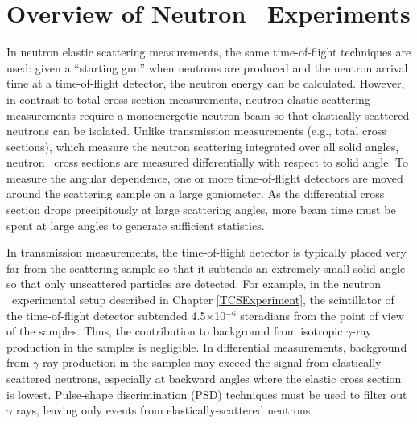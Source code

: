 \section{Overview of Neutron \el\ Experiments}
In neutron elastic scattering measurements, the same time-of-flight techniques are used:
given a ``starting gun'' when neutrons are produced and the neutron arrival time
at a time-of-flight detector, the neutron energy can be calculated.
However, in contrast to total cross section measurements, neutron elastic scattering
measurements require a monoenergetic neutron beam so that elastically-scattered
neutrons can be isolated. Unlike transmission measurements (e.g., total cross
sections), which measure the neutron scattering integrated
over all solid angles, neutron \el\ cross sections are measured differentially with respect to 
solid angle. To measure the angular dependence, one or more time-of-flight detectors
are moved around the scattering sample on a large goniometer. As the differential cross section 
drops precipitously at large scattering angles, more beam time must be spent at
large angles to generate sufficient statistics.

In transmission measurements, the time-of-flight detector is typically placed
very far from the scattering sample so that it subtends an extremely small solid
angle so that only unscattered particles are detected.
For example, in the neutron \tot\ experimental setup described in Chapter
\ref{TCSExperiment}, the scintillator of the time-of-flight detector subtended
4.5$\times$10$^{-6}$ steradians from the point of view of the samples. Thus, the
contribution to background from isotropic $\gamma$-ray production in the samples is negligible.
In differential measurements,
background from $\gamma$-ray production in the samples may exceed the signal
from elastically-scattered neutrons, especially at backward angles where the elastic
cross section is lowest. Pulse-shape discrimination (\gls{PSD})
techniques must be used to filter out 
$\gamma$ rays, leaving only events from elastically-scattered neutrons.

